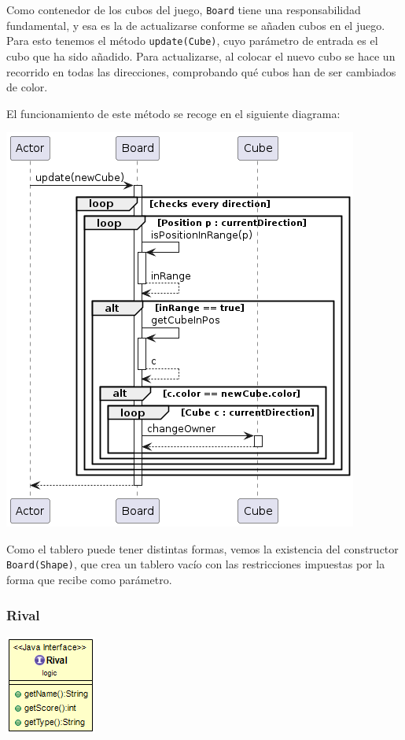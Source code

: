\documentclass[../DocumentoOficial.tex]{subfiles}
\begin{document}
Como contenedor de los cubos del juego, \texttt{Board} tiene una responsabilidad fundamental, y esa es la de actualizarse conforme se añaden cubos en el juego. Para esto tenemos el método \texttt{update(Cube)}, cuyo parámetro de entrada es el cubo que ha sido añadido. Para actualizarse, al colocar el nuevo cubo se hace un recorrido en todas las direcciones, comprobando qué cubos han de ser cambiados de color.

El funcionamiento de este método se recoge en el siguiente diagrama:

\begin{center}
\includegraphics[scale=0.75]{Board.update()-sprint7.png} 
\end{center}

Como el tablero puede tener distintas formas, vemos la existencia del constructor \texttt{Board(Shape)}, que crea un tablero vacío con las restricciones impuestas por la forma que recibe como parámetro.

\subsubsection{Rival}

\begin{center}
\includegraphics[scale=0.75]{Rival-sprint7.png} 
\end{center}
\end{document}

